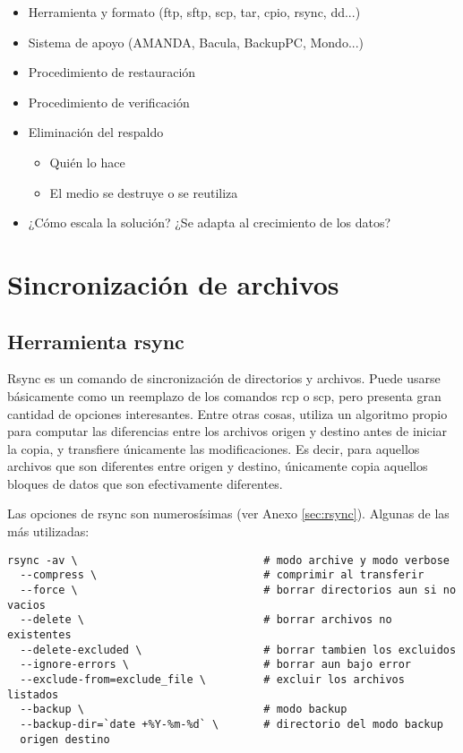 \begin{itemize}
	\item Herramienta y formato (ftp, sftp, scp, tar, cpio, rsync, dd...)  
	\item Sistema de apoyo (AMANDA, Bacula, BackupPC, Mondo...)
	\item Procedimiento de restauración
	\item Procedimiento de verificación
	\item Eliminación del respaldo
	\begin{itemize}
		\item Quién lo hace
		\item El medio se destruye o se reutiliza 
	\end{itemize}
	\item ¿Cómo escala la solución? ¿Se adapta al crecimiento de los datos?
\end{itemize}



\section{Sincronización de archivos}

\subsection{Herramienta rsync}

Rsync es un comando de sincronización de directorios y archivos. Puede usarse básicamente como un reemplazo de los comandos rcp o scp, pero presenta gran cantidad de opciones interesantes. Entre otras cosas, utiliza un algoritmo propio para computar las diferencias entre los archivos origen y destino antes de iniciar la copia, y transfiere únicamente las modificaciones. Es decir, para aquellos archivos que son diferentes entre origen y destino, únicamente copia aquellos bloques de datos que son efectivamente diferentes.  

Las opciones de rsync son numerosísimas (ver Anexo \ref{sec:rsync}). Algunas de las más utilizadas:


\begin{lstlisting}
rsync -av \                             # modo archive y modo verbose
  --compress \                          # comprimir al transferir
  --force \                             # borrar directorios aun si no vacios
  --delete \                            # borrar archivos no existentes
  --delete-excluded \                   # borrar tambien los excluidos
  --ignore-errors \                     # borrar aun bajo error
  --exclude-from=exclude_file \         # excluir los archivos listados
  --backup \                            # modo backup
  --backup-dir=`date +%Y-%m-%d` \       # directorio del modo backup
  origen destino
\end{lstlisting}

